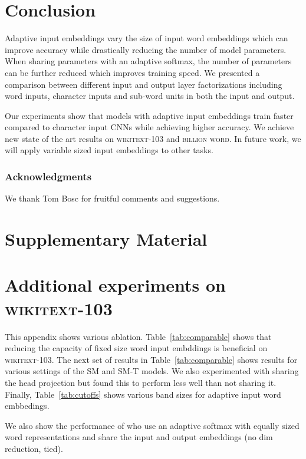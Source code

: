 \documentclass{article} \usepackage{iclr2019_conference,times}
\def\gbw{\textsc{billion word}}
\def\wiki{\textsc{wikitext-103}}
\def\sm{\textsc{SM}}
\def\smt{\textsc{SM-T}}
\begin{document}
\section{Conclusion}

Adaptive input embeddings vary the size of input word embeddings which can improve accuracy while drastically reducing the number of model parameters. 
When sharing parameters with an adaptive softmax, the number of parameters can be further reduced which improves training speed.
We presented a comparison between different input and output layer factorizations including word inputs, character inputs and sub-word units in both the input and output.

Our experiments show that models with adaptive input embeddings train faster compared to character input CNNs while achieving higher accuracy.
We achieve new state of the art results on \wiki{} and \gbw{}.
In future work, we will apply variable sized input embeddings to other tasks.

 
\subsubsection*{Acknowledgments}
We thank Tom Bosc for fruitful comments and suggestions.




\clearpage
\appendix
\section*{Supplementary Material}
\section{Additional experiments on \wiki{}}\label{app:ablation}

This appendix shows various ablation. 
Table~\ref{tab:comparable} shows that reducing the capacity of fixed size word input embddings is beneficial on \wiki{}.
The next set of results in Table~\ref{tab:comparable} shows results for various settings of the \sm{} and \smt{} models.
We also experimented with sharing the head projection but found this to perform less well than not sharing it.
Finally, Table~\ref{tab:cutoffs} shows various band sizes for adaptive input word embbedings.

We also show the performance of \citet{merity2018lm} who use an adaptive softmax with equally sized word representations and share the input and output embeddings (no dim reduction, tied).
\end{document}
